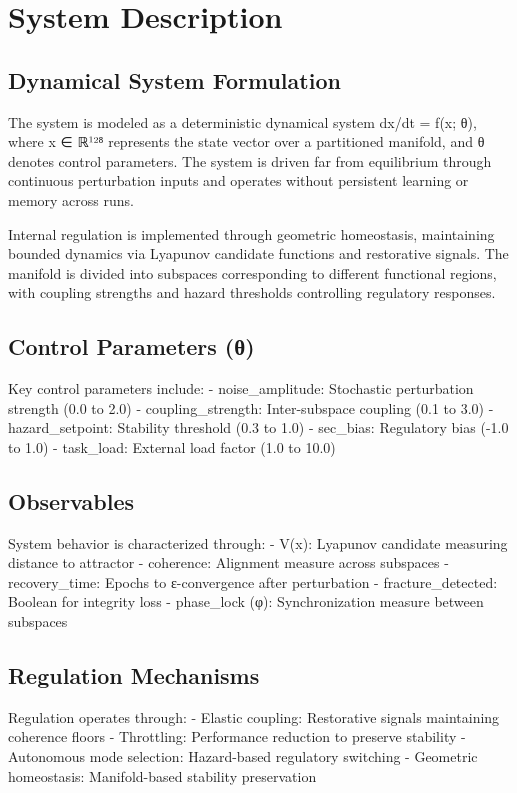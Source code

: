 \documentclass[12pt,a4paper]{report}
\begin{document}
\section{System Description}

\subsection{Dynamical System Formulation}

The system is modeled as a deterministic dynamical system dx/dt = f(x; θ), where x ∈ ℝ¹²⁸ represents the state vector over a partitioned manifold, and θ denotes control parameters. The system is driven far from equilibrium through continuous perturbation inputs and operates without persistent learning or memory across runs.

Internal regulation is implemented through geometric homeostasis, maintaining bounded dynamics via Lyapunov candidate functions and restorative signals. The manifold is divided into subspaces corresponding to different functional regions, with coupling strengths and hazard thresholds controlling regulatory responses.

\subsection{Control Parameters (θ)}

Key control parameters include:
- noise_amplitude: Stochastic perturbation strength (0.0 to 2.0)
- coupling_strength: Inter-subspace coupling (0.1 to 3.0)
- hazard_setpoint: Stability threshold (0.3 to 1.0)
- sec_bias: Regulatory bias (-1.0 to 1.0)
- task_load: External load factor (1.0 to 10.0)

\subsection{Observables}

System behavior is characterized through:
- V(x): Lyapunov candidate measuring distance to attractor
- coherence: Alignment measure across subspaces
- recovery_time: Epochs to ε-convergence after perturbation
- fracture_detected: Boolean for integrity loss
- phase_lock (φ): Synchronization measure between subspaces

\subsection{Regulation Mechanisms}

Regulation operates through:
- Elastic coupling: Restorative signals maintaining coherence floors
- Throttling: Performance reduction to preserve stability
- Autonomous mode selection: Hazard-based regulatory switching
- Geometric homeostasis: Manifold-based stability preservation
\end{document}

